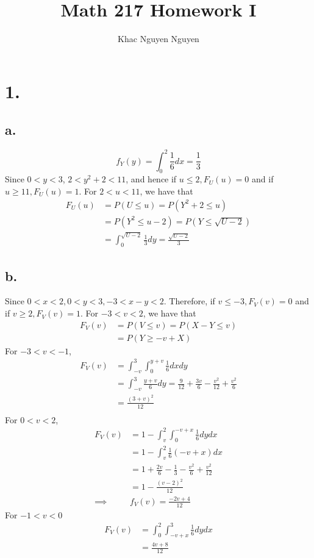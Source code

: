 \documentclass[11pt]{article}
\title{\textbf{Math 217 Homework I}}
\author{Khac Nguyen Nguyen}
\date{}
\begin{document}
\section*{1.}
\subsection*{a.}
\[
    f_Y(y) = \int_0^2 \frac{1}{6}dx = \frac{1}{3} 
\]
Since $0<y<3$, $2<y^2 +2<11$, and hence if $u\le 2, F_U(u) = 0$ and if $u \ge 11, F_U(u) = 1$. For $2<u<11$, we have that
\begin{equation*}
    \begin{aligned}
        F_U(u) &= P(U\le u) = P(Y^2+2 \le u) \\
        &= P(Y^2 \le u-2) = P(Y \le \sqrt{U-2}) \\
        &= \int^{\sqrt{U-2}}_0 \frac{1}{3}dy = \frac{\sqrt{U-2}}{3}
    \end{aligned}
\end{equation*}
\subsection*{b.}
Since $0<x<2, 0<y<3, -3<x-y<2$. Therefore, if $v \le -3, F_V(v) = 0$ and if $v\ge 2, F_V(v) = 1$. 
For $-3<v<2$, we have that
\begin{equation*}
    \begin{aligned}
        F_V(v) &= P(V \le v) = P(X-Y\le v) \\ 
        &= P(Y\ge -v+X)         
    \end{aligned}
\end{equation*}
For $-3<v<-1$,
\begin{equation*}
    \begin{aligned}
        F_V(v) &= \int_{-v}^3 \int_{0}^{y+v} \frac{1}{6} dxdy \\
        &= \int_{-v}^3 \frac{y+v}{6} dy = \frac{9}{12} + \frac{3v}{6} -\frac{v^2}{12} + \frac{v^2}{6} \\
        &= \frac{(3+v)^2}{12} \\
    \end{aligned}
\end{equation*}
For $0<v<2$, 
\begin{equation*}
    \begin{aligned}
        F_V(v) &= 1- \int_v^2 \int_0^{-v+x} \frac{1}{6} dy dx \\
        &= 1- \int_v^2 \frac{1}{6}(-v+x) dx \\
        &= 1 +\frac{2v}{6} - \frac{1}{3} - \frac{v^2}{6} + \frac{v^2}{12}\\
        &= 1- \frac{(v-2)^2}{12} \\
        \implies & f_V(v) = \frac{-2v+4}{12}
    \end{aligned}
\end{equation*}
For $-1<v<0$
\begin{equation*}
    \begin{aligned}
        F_V(v) &= \int_0^2 \int_{-v+x}^3 \frac{1}{6} dydx \\
        &= \frac{4v+8}{12}
    \end{aligned}
\end{equation*}
\pagebreak
\end{document}
